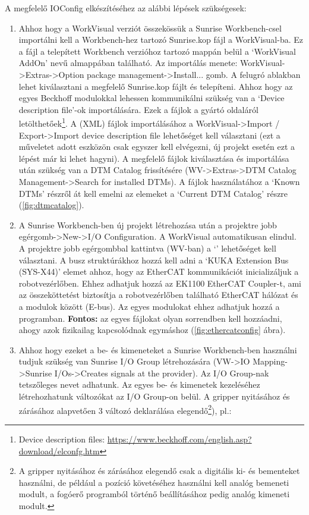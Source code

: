 \documentclass[../documentation.tex]{subfiles}
\begin{document}
A megfelelő IOConfig elkészítéséhez az alábbi lépések szükségesek:
\begin{enumerate}
	\item Ahhoz hogy a WorkVisual verziót összekössük a Sunrise Workbench-csel importálni kell a Workbench-hez tartozó Sunrise.kop fájl a WorkVisual-ba. Ez a fájl a telepített Workbench verzióhoz tartozó mappán belül a `WorkVisual AddOn' nevű almappában található. Az importálás menete: WorkVisual->Extras->Option package management->Install... gomb. A felugró ablakban lehet kiválasztani a megfelelő Sunrise.kop fájlt és telepíteni. Ahhoz hogy az egyes Beckhoff modulokkal lehessen kommunikálni szükség van a `Device description file'-ok importálására. Ezek a fájlok a gyártó oldaláról letölthetőek\footnote{Device description files: \url{https://www.beckhoff.com/english.asp?download/elconfg.htm}}. A (XML) fájlok importálásához a WorkVisual->Import / Export->Import device description file lehetőséget kell választani (ezt a műveletet adott eszközön csak egyszer kell elvégezni, új projekt esetén ezt a lépést már ki lehet hagyni). A megfelelő fájlok kiválasztása és importálása után szükség van a DTM Catalog frissítésére (WV->Extras->DTM Catalog Management->Search for installed DTMs). A fájlok használatához a `Known DTMs' részről át kell emelni az elemeket a `Current DTM Catalog' részre (\ref{fig:dtmcatalog}).
	\item A Sunrise Workbench-ben új projekt létrehozása után a projektre jobb egérgomb->New->I/O Configuration. A WorkVisual automatikusan elindul. A projektre jobb egérgombbal kattintva (WV-ban) a `' lehetőséget kell választani. A busz struktúrákhoz hozzá kell adni a `KUKA Extension Bus (SYS-X44)' elemet ahhoz, hogy az EtherCAT kommunikációt inicializáljuk a robotvezérlőben. Ehhez adhatjuk hozzá az EK1100 EtherCAT Coupler-t, ami az összeköttetést biztosítja a robotvezérlőben található EtherCAT hálózat és a modulok között (E-bus). Az egyes modulokat ehhez adhatjuk hozzá a programban. \textbf{Fontos:} az egyes fájlokat olyan sorrendben kell hozzáadni, ahogy azok fizikailag kapcsolódnak egymáshoz (\ref{fig:ethercatconfig} ábra).
	\item Ahhoz hogy ezeket a be- és kimeneteket a Sunrise Workbench-ben használni tudjuk szükség van Sunrise I/O Group létrehozására (VW->IO Mapping->Sunrise I/Os->Creates signals at the provider). Az I/O Group-nak tetszőleges nevet adhatunk. Az egyes be- és kimenetek kezeléséhez létrehozhatunk változókat az I/O Group-on belül. A gripper nyitásához és zárásához alapvetően 3 változó deklarálása elegendő\footnote{A gripper nyitásához és zárásához elegendő csak a digitális ki- és bementeket használni, de például a pozíció követéséhez használni kell analóg bemeneti modult, a fogóerő programból történő beállításához pedig analóg kimeneti modult.}), pl.:

\end{enumerate}
\end{document}

